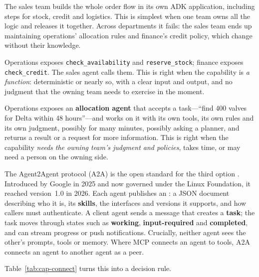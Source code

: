 \begin{description}[leftmargin=1em,itemsep=3pt]
  \item[Inside one workflow.] The sales team builds the whole order flow in its own ADK application, including steps for stock, credit and logistics. This is simplest when one team owns all the logic and releases it together. Across departments it fails: the sales team ends up maintaining operations' allocation rules and finance's credit policy, which change without their knowledge.
  \item[As MCP tools.] Operations exposes \texttt{check\_availability} and \texttt{reserve\_stock}; finance exposes \texttt{check\_credit}. The sales agent calls them. This is right when the capability is \emph{a function}: deterministic or nearly so, with a clear input and output, and no judgment that the owning team needs to exercise in the moment.
  \item[As agents, over A2A.] Operations exposes an \textbf{allocation agent} that accepts a task---``find 400 valves for Delta within 48 hours''---and works on it with its own tools, its own rules and its own judgment, possibly for many minutes, possibly asking a planner, and returns a result or a request for more information. This is right when the capability \emph{needs the owning team's judgment and policies}, takes time, or may need a person on the owning side.
\end{description}

The Agent2Agent protocol (A2A) is the open standard for the third option \citep{a2a2026spec}. Introduced by Google in 2025 and now governed under the Linux Foundation, it reached version~1.0 in 2026. Each agent publishes an : a JSON document describing who it is, its \textbf{skills}, the interfaces and versions it supports, and how callers must authenticate. A client agent sends a message that creates a \textbf{task}; the task moves through states such as \textbf{working}, \textbf{input-required} and \textbf{completed}, and can stream progress or push notifications. Crucially, neither agent sees the other's prompts, tools or memory. Where MCP connects an agent to tools, A2A connects an agent to another agent as a peer.

Table~\ref{tab:cap-connect} turns this into a decision rule.


